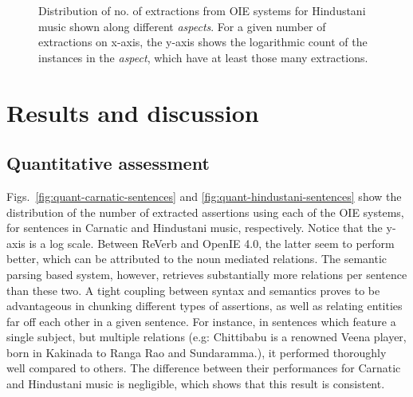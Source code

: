 \documentclass{llncs}
\begin{document}
{\begin{figure}[t]
\begin{center}
{		 \label{fig:quant-hindustani-reltype}
		}%
        \qquad
\end{center}
\caption{Distribution of no. of extractions from OIE systems for Hindustani music shown along different \textit{aspects}. For a given number of extractions on x-axis, the y-axis shows the logarithmic count of the instances in the \textit{aspect}, which have at least those many extractions.}
\label{fig:quant-hindustani}
\end{figure}
}

\section{Results and discussion}
\label{sec:results}
\subsection{Quantitative assessment}
Figs.~\ref{fig:quant-carnatic-sentences} and \ref{fig:quant-hindustani-sentences} show the distribution of the number of extracted assertions using each of the OIE systems, for sentences in Carnatic and Hindustani music, respectively. Notice that the y-axis is a log scale. Between ReVerb and OpenIE 4.0, the latter seem to perform better, which can be attributed to the noun mediated relations. The semantic parsing based system, however, retrieves substantially more relations per sentence than these two. A tight coupling between syntax and semantics proves to be advantageous in chunking different types of assertions, as well as relating entities far off each other in a given sentence. For instance, in sentences which feature a single subject, but multiple relations (e.g: Chittibabu is a renowned Veena player, born in Kakinada to Ranga Rao and Sundaramma.), it performed thoroughly well compared to others. The difference between their performances for Carnatic and Hindustani music is negligible, which shows that this result is consistent.
\end{document}
